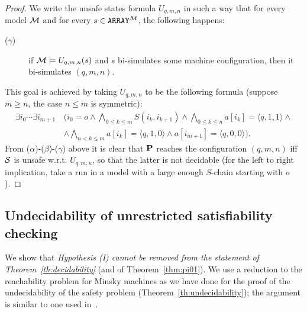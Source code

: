 \documentclass{LMCS}
\newcommand{\cM}{\ensuremath \mathcal M}
\newcommand{\cSi}{\ensuremath \mathcal S}
\theoremstyle{plain}\newtheorem{assumption}[thm]{Assumption}
\theoremstyle{plain}\newtheorem{proposition}[thm]{Proposition}
\theoremstyle{plain}\newtheorem{property}[thm]{Property}
\theoremstyle{plain}\newtheorem{example}[thm]{Example}
\theoremstyle{plain}\newtheorem{claim}[thm]{Claim}
\theoremstyle{plain}\newtheorem{lemma}[thm]{Lemma}
\begin{document}
\begin{proof}
We write the unsafe states formula $U_{q,m,n}$ in such a way that for
every model $\cM$ and for every $s\in \mathtt{ARRAY}^{\cM}$, the
following happens:
\begin{description}
\item[{\rm ($\gamma$)}] if $\cM\models U_{q,m,n}(s)$ and $s$ bi-simulates some machine configuration,
  then it bi-simulates $(q,m,n)$.
\end{description}
This goal is achieved by taking $U_{q,m,n}$ to be the following
formula (suppose $m\geq n$, the case $n\leq m$ is symmetric):
\begin{eqnarray*}
  \exists i_0\cdots\exists i_{m+1}\,
  & (i_0=o \wedge \bigwedge_{0\leq k\leq m} S(i_k, i_{k+1}) \wedge
  \bigwedge_{0\leq k\leq n} a[i_k]=\langle q, 1,1\rangle \wedge \\
  &\wedge
  \bigwedge_{n< k\leq m} a[i_k]=\langle q, 1,0\rangle \wedge
  a[i_{m+1}]=\langle q, 0,0\rangle).~~~~~~~~~~~
\end{eqnarray*}
From ($\alpha$)-($\beta$)-($\gamma$) above it is clear that $\bf P$
reaches the configuration $(q,m,n)$ iff $\cSi$ is unsafe
w.r.t. $U_{q,m,n}$, so
that the latter is not decidable (for the left to right implication, take a
  run in a model with a large enough $S$-chain starting with $o$).
\end{proof}









\subsection*{Undecidability of unrestricted satisfiability checking}

We show that \emph{Hypothesis (I) cannot be removed from the statement
  of Theorem~\ref{th:decidability}} (and of Theorem~\ref{thm:pi01}).
We use 
a reduction to the reachability problem for Minsky machines as we have
done for the proof of the undecidability of the safety problem
(Theorem~\ref{th:undecidability}); the argument is similar to one used
in~\cite{arrays}.
\end{document}
